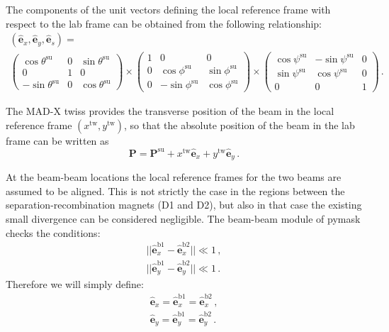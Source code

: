 The components of the unit vectors defining the local reference frame with respect to the lab frame can be obtained from the following relationship:
\begin{multline}
\left(\hat{\textbf{e}}_x, \hat{\textbf{e}}_y, \hat{\textbf{e}}_s\right)=\\
\left(\begin{array}{ccc}
\cos \theta^\text{su} & 0 & \sin \theta^\text{su} \\
0 & 1 & 0 \\
-\sin \theta^\text{su} & 0 & \cos \theta^\text{su}
\end{array}\right)
\times
\left(\begin{array}{ccc}
1 & 0 & 0 \\
0 & \cos \phi^\text{su} & \sin \phi^\text{su} \\
0 & -\sin \phi^\text{su} & \cos \phi^\text{su}
\end{array}\right)
\times
\left(\begin{array}{ccc}
\cos \psi^\text{su} & -\sin \psi^\text{su} & 0 \\
\sin \psi^\text{su} & \cos \psi^\text{su} & 0 \\
0 & 0 & 1
\end{array}\right)   \, .
\end{multline}

The MAD-X twiss provides the transverse position of the beam in the local reference frame $(x^\text{tw}, y^\text{tw})$, so that the absolute position of the beam in the lab frame can be written as
\begin{equation}
    \textbf{P} = \textbf{P}^\text{su} 
    + x^\text{tw} \hat{\textbf{e}}_x
    + y^\text{tw} \hat{\textbf{e}}_y
    \, .
\end{equation}

At the beam-beam locations the local reference frames for the two beams are assumed to be aligned. This is not strictly the case in the regions between the separation-recombination magnets (D1 and D2), but also in that case the existing small divergence can be considered negligible.
The beam-beam module of pymask checks the conditions:
\begin{align}
    ||\hat{\textbf{e}}_x^\text{b1} -  \hat{\textbf{e}}_x^\text{b2}|| \ll 1 \, ,\\
    ||\hat{\textbf{e}}_y^\text{b1} -  \hat{\textbf{e}}_y^\text{b2}|| \ll 1 \, .
\end{align}
Therefore we will simply define:
\begin{align}
    \hat{\textbf{e}}_x = \hat{\textbf{e}}_x^\text{b1} = \hat{\textbf{e}}_x^\text{b2} \, ,\\
    \hat{\textbf{e}}_y = \hat{\textbf{e}}_y^\text{b1} = \hat{\textbf{e}}_y^\text{b2} \, .
\end{align}

